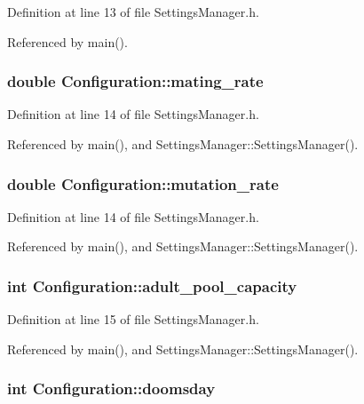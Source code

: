 Definition at line 13 of file SettingsManager.h.

Referenced by main().\hypertarget{classConfiguration_e43c312f9ccfea3cc282216fa64aa18f}{
\subsubsection{\setlength{\rightskip}{0pt plus 5cm}double {\bf Configuration::mating\_\-rate}}}
\label{classConfiguration_e43c312f9ccfea3cc282216fa64aa18f}




Definition at line 14 of file SettingsManager.h.

Referenced by main(), and SettingsManager::SettingsManager().\hypertarget{classConfiguration_4d76d841853c3c44850576d73cafa4c2}{
\subsubsection{\setlength{\rightskip}{0pt plus 5cm}double {\bf Configuration::mutation\_\-rate}}}
\label{classConfiguration_4d76d841853c3c44850576d73cafa4c2}




Definition at line 14 of file SettingsManager.h.

Referenced by main(), and SettingsManager::SettingsManager().\hypertarget{classConfiguration_4a45ec1ea02f8e99f41fb79a4615e38f}{
\subsubsection{\setlength{\rightskip}{0pt plus 5cm}int {\bf Configuration::adult\_\-pool\_\-capacity}}}
\label{classConfiguration_4a45ec1ea02f8e99f41fb79a4615e38f}




Definition at line 15 of file SettingsManager.h.

Referenced by main(), and SettingsManager::SettingsManager().\hypertarget{classConfiguration_d46898d81812dfd7983dfd6e3a507a77}{
\subsubsection{\setlength{\rightskip}{0pt plus 5cm}int {\bf Configuration::doomsday}}}
\label{classConfiguration_d46898d81812dfd7983dfd6e3a507a77}




